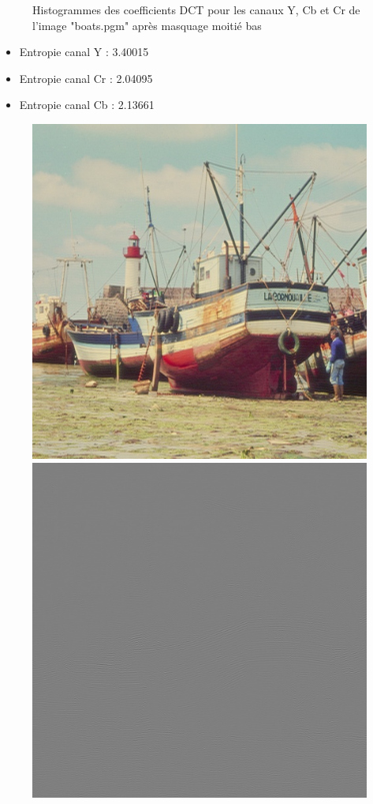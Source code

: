 \documentclass[12pt]{report}
\begin{document}
\begin{figure}[H]
\begin{center}
\caption{Histogrammes des coefficients DCT pour les canaux Y, Cb et Cr de l'image "boats.pgm" après masquage moitié bas}
\end{center}
\end{figure}

\begin{itemize}
\item Entropie canal Y : 3.40015
\item Entropie canal Cr : 2.04095
\item Entropie canal Cb : 2.13661
\end{itemize}

\begin{figure}[H]
\begin{center}
\includegraphics[scale=0.4]{../ImageRes/idct_masked2_result.jpg} 
\includegraphics[scale=0.4]{../ImageRes/idct_masked2_disto.jpg} 

\end{center}
\end{figure}
\end{document}
